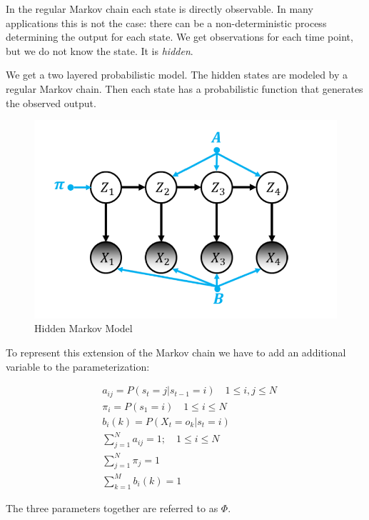 In the regular Markov chain each state is directly observable. In many applications this is not the case: there can be a non-deterministic process determining the output for each state. We get observations for each time point, but we do not know the state. It is \emph{hidden}. 

We get a two layered probabilistic model. The hidden states are modeled by a regular Markov chain. Then each state has a probabilistic function that generates the observed output. 

\begin{figure}
    \centering
   \includegraphics{figures/HMM.png}
\caption{Hidden Markov Model}    
\label{fig:hmm}
\end{figure}

\newpage
To represent this extension of the Markov chain we have to add an additional variable to the parameterization: 

\begin{equation}
\begin{aligned}
&a_{i j}=P\left(s_{t}=j | s_{t-1}=i\right) \quad 1 \leq i, j \leq N \\
&\pi_{i}=P\left(s_{1}=i\right) \quad 1 \leq i \leq N \\
&b_{i}(k)=P\left(X_{t}=o_{k} | s_{t}=i\right) \\
&\sum_{j=1}^{N} a_{i j}=1 ; \quad 1 \leq i \leq N \\
&\sum_{j=1}^{N} \pi_{j}=1 \\
&\sum_{k=1}^{M} b_{i}(k)=1
\end{aligned}
\label{eq:hmm-def}
\end{equation}

The three parameters together are referred to as $\Phi$.

